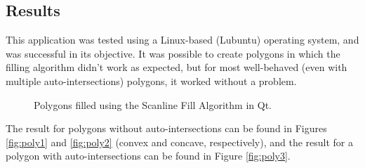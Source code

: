 \documentclass[12pt]{article}
\begin{document}
\subsection{Results}
This application was tested using a Linux-based (Lubuntu) operating system, and was successful in its objective. It was possible to create polygons in which the filling algorithm didn't work as expected, but for most well-behaved (even with multiple auto-intersections) polygons, it worked without a problem.

\begin{figure}
    \centering
    \qquad
    \caption{Polygons filled using the Scanline Fill Algorithm in Qt.}
    \label{fig:poly}
\end{figure}

The result for polygons without auto-intersections can be found in Figures \ref{fig:poly1} and \ref{fig:poly2} (convex and concave, respectively), and the result for a polygon with auto-intersections can be found in Figure \ref{fig:poly3}.
\end{document}
